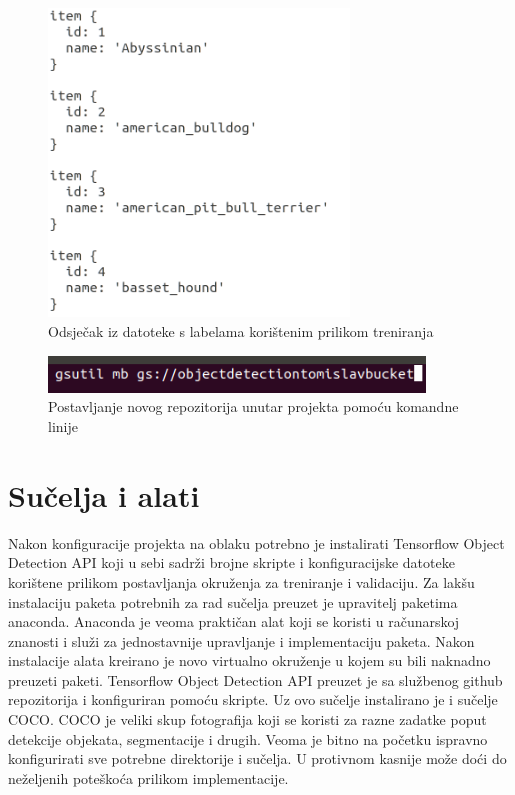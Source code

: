 \begin{figure}[ht]
    \centering
    \includegraphics[width=8cm]{img/pet_labels.png}
    \caption{Odsječak iz datoteke s labelama korištenim prilikom treniranja}
    \label{Pet labels}
\end{figure}

\begin{figure}[htb]
    \centering
    \includegraphics[width=10cm]{img/Gsutil.png}
    \caption{Postavljanje novog repozitorija unutar projekta pomoću komandne linije}
    \label{Gsutil}
\end{figure}

\section{Sučelja i alati}
Nakon konfiguracije projekta na oblaku potrebno je instalirati Tensorflow Object Detection API koji u sebi sadrži brojne skripte i konfiguracijske datoteke korištene prilikom postavljanja okruženja za treniranje i validaciju. 
Za lakšu instalaciju paketa potrebnih za rad sučelja preuzet je upravitelj paketima anaconda. Anaconda je veoma praktičan alat koji se koristi u računarskoj znanosti i služi za jednostavnije upravljanje i implementaciju paketa. 
Nakon instalacije alata kreirano je novo virtualno okruženje u kojem su bili naknadno preuzeti paketi. Tensorflow Object Detection API preuzet je sa službenog github repozitorija i konfiguriran pomoću skripte.
Uz ovo sučelje instalirano je i sučelje COCO. COCO je veliki skup fotografija koji se koristi za razne zadatke poput detekcije objekata, segmentacije i drugih.\newline
Veoma je bitno na početku ispravno konfigurirati sve potrebne direktorije i sučelja. U protivnom kasnije može doći do neželjenih poteškoća prilikom implementacije.

